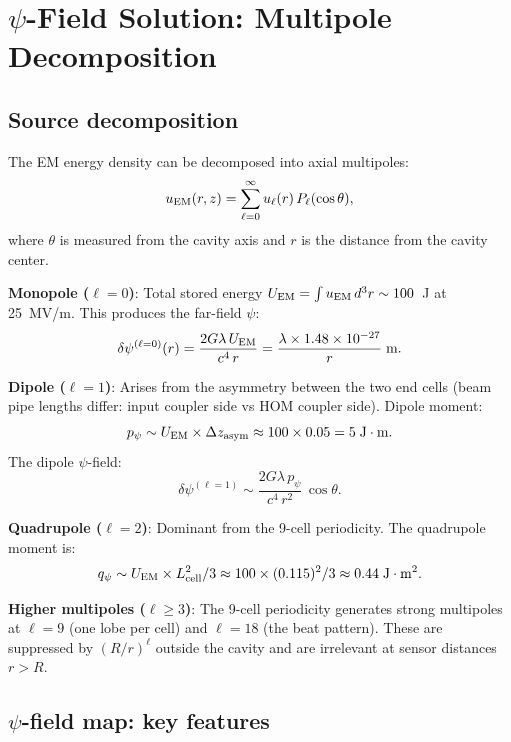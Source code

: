 \documentclass[11pt]{article}
\newcommand{\ee}[1]{\times 10^{#1}}
\newcommand{\dpsi}{\delta\psi}
\theoremstyle{definition}
\theoremstyle{remark}
\begin{document}
\section{$\psi$-Field Solution: Multipole Decomposition}

\subsection{Source decomposition}

The EM energy density can be decomposed into axial multipoles:
\begin{equation}
u_{\rm EM}(r,z) = \sum_{\ell=0}^{\infty} u_\ell(r)\,P_\ell(\cos\theta),
\end{equation}
where $\theta$ is measured from the cavity axis and $r$ is the
distance from the cavity center.

\textbf{Monopole ($\ell = 0$)}: Total stored energy
$U_{\rm EM} = \int u_{\rm EM}\,d^3r \sim 100$~J at 25~MV/m.
This produces the far-field $\psi$:
\begin{equation}
\dpsi^{(\ell=0)}(r) = \frac{2G\lambda\,U_{\rm EM}}{c^4\,r}
= \frac{\lambda \times 1.48\ee{-27}}{r}\;\text{m}.
\end{equation}

\textbf{Dipole ($\ell = 1$)}: Arises from the asymmetry between
the two end cells (beam pipe lengths differ: input coupler side
vs HOM coupler side). Dipole moment:
\begin{equation}
p_\psi \sim U_{\rm EM} \times \Delta z_{\rm asym}
\approx 100 \times 0.05 = 5\;\text{J}\cdot\text{m}.
\end{equation}
The dipole $\psi$-field:
\begin{equation}
\dpsi^{(\ell=1)} \sim \frac{2G\lambda\,p_\psi}{c^4\,r^2}\,\cos\theta.
\end{equation}

\textbf{Quadrupole ($\ell = 2$)}: Dominant from the 9-cell
periodicity. The quadrupole moment is:
\begin{equation}
q_\psi \sim U_{\rm EM} \times L_{\rm cell}^2 / 3
\approx 100 \times (0.115)^2 / 3 \approx 0.44\;\text{J}\cdot\text{m}^2.
\end{equation}

\textbf{Higher multipoles ($\ell \geq 3$)}: The 9-cell periodicity
generates strong multipoles at $\ell = 9$ (one lobe per cell) and
$\ell = 18$ (the beat pattern). These are suppressed by $(R/r)^\ell$
outside the cavity and are irrelevant at sensor distances $r > R$.

\subsection{$\psi$-field map: key features}
\end{document}
